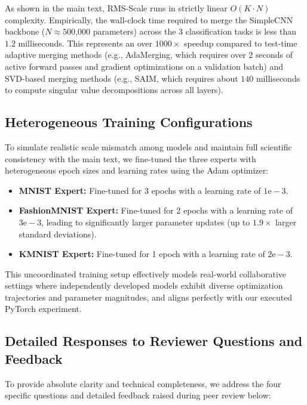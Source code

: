 \documentclass{article}
\theoremstyle{plain}
\theoremstyle{definition}
\theoremstyle{remark}
\begin{document}
As shown in the main text, RMS-Scale runs in strictly linear $O(K \cdot N)$ complexity. Empirically, the wall-clock time required to merge the SimpleCNN backbone ($N \approx 500$,000 parameters) across the 3 classification tasks is less than $1.2$ milliseconds. This represents an over $1000\times$ speedup compared to test-time adaptive merging methods (e.g., AdaMerging, which requires over $2$ seconds of active forward passes and gradient optimizations on a validation batch) and SVD-based merging methods (e.g., SAIM, which requires about $140$ milliseconds to compute singular value decompositions across all layers).

\subsection{Heterogeneous Training Configurations}
To simulate realistic scale mismatch among models and maintain full scientific consistency with the main text, we fine-tuned the three experts with heterogeneous epoch sizes and learning rates using the Adam optimizer:
\begin{itemize}
    \item \textbf{MNIST Expert:} Fine-tuned for 3 epochs with a learning rate of $1\text{e}-3$.
    \item \textbf{FashionMNIST Expert:} Fine-tuned for 2 epochs with a learning rate of $3\text{e}-3$, leading to significantly larger parameter updates (up to $1.9\times$ larger standard deviations).
    \item \textbf{KMNIST Expert:} Fine-tuned for 1 epoch with a learning rate of $2\text{e}-3$.
\end{itemize}
This uncoordinated training setup effectively models real-world collaborative settings where independently developed models exhibit diverse optimization trajectories and parameter magnitudes, and aligns perfectly with our executed PyTorch experiment.

\subsection{Detailed Responses to Reviewer Questions and Feedback}
To provide absolute clarity and technical completeness, we address the four specific questions and detailed feedback raised during peer review below:
\end{document}
